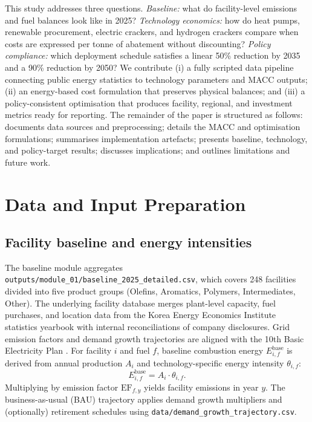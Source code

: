 \documentclass[12pt,a4paper]{article}
\begin{document}
This study addresses three questions. \emph{Baseline:} what do facility-level emissions and fuel balances look like in 2025? \emph{Technology economics:} how do heat pumps, renewable procurement, electric crackers, and hydrogen crackers compare when costs are expressed per tonne of abatement without discounting? \emph{Policy compliance:} which deployment schedule satisfies a linear 50\% reduction by 2035 and a 90\% reduction by 2050? We contribute (i) a fully scripted data pipeline connecting public energy statistics \citep{KEEI2023} to technology parameters and MACC outputs; (ii) an energy-based cost formulation that preserves physical balances; and (iii) a policy-consistent optimisation that produces facility, regional, and investment metrics ready for reporting. The remainder of the paper is structured as follows:  documents data sources and preprocessing;  details the MACC and optimisation formulations;  summarises implementation artefacts;  presents baseline, technology, and policy-target results;  discusses implications; and  outlines limitations and future work.

\section{Data and Input Preparation}
\label{sec:data}

\subsection{Facility baseline and energy intensities}

The baseline module aggregates \texttt{outputs/module\_01/baseline\_2025\_detailed.csv}, which covers 248 facilities divided into five product groups (Olefins, Aromatics, Polymers, Intermediates, Other). The underlying facility database merges plant-level capacity, fuel purchases, and location data from the Korea Energy Economics Institute statistics yearbook \citep{KEEI2023} with internal reconciliations of company disclosures. Grid emission factors and demand growth trajectories are aligned with the 10th Basic Electricity Plan \citep{Korea10thPlan}. For facility $i$ and fuel $f$, baseline combustion energy $E^{\mathrm{base}}_{i,f}$ is derived from annual production $A_i$ and technology-specific energy intensity $\theta_{i,f}$:
\begin{equation}
E^{\mathrm{base}}_{i,f} = A_i \cdot \theta_{i,f}.
\end{equation}
Multiplying by emission factor $\mathrm{EF}_{f,y}$ yields facility emissions in year $y$. The business-as-usual (BAU) trajectory applies demand growth multipliers and (optionally) retirement schedules using \texttt{data/demand\_growth\_trajectory.csv}.
\end{document}
